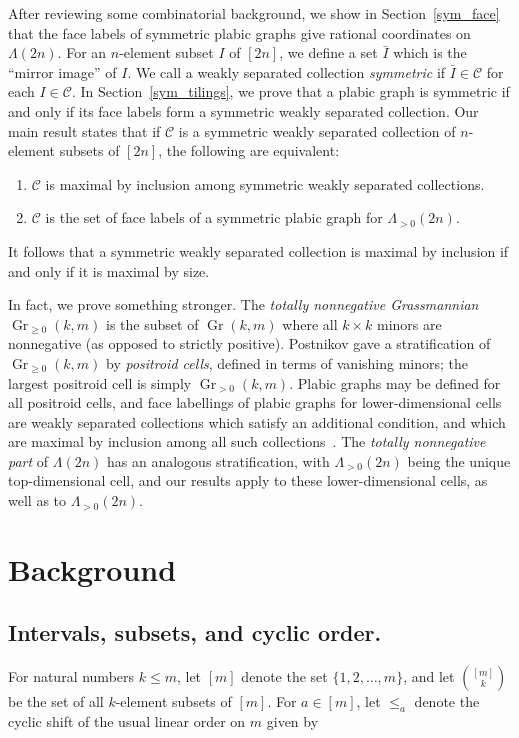 \documentclass[ALCO,ThmDefs,Unicode,epreuves]{cedram}
\DeclareMathOperator{\Gr}{Gr}
\newcommand{\Lm}{\Lambda}
\begin{document}
After reviewing some combinatorial background, we show in Section~\ref{sym_face} that the face labels of symmetric plabic graphs give rational coordinates on $\Lm(2n)$. For an $n$-element subset $I$ of $[2n]$, we define a set $\bar{I}$ which is the ``mirror image'' of $I$. We call a weakly separated collection \emph{symmetric} if $\bar{I} \in \mathcal{C}$ for each $I \in \mathcal{C}$. In Section~\ref{sym_tilings}, we prove that a plabic graph is symmetric if and only if its face labels form a symmetric weakly separated collection.
Our main result states that if $\mathcal{C}$ is a symmetric weakly separated collection of $n$-element subsets of $[2n]$, the following are equivalent:
\begin{enumerate}
\item $\mathcal{C}$ is maximal by inclusion among symmetric weakly separated collections.
\item $\mathcal{C}$ is the set of face labels of a symmetric plabic graph for $\Lm_{>0}(2n)$.
\end{enumerate}
It follows that a symmetric weakly separated collection is maximal by inclusion if and only if it is maximal by size.

In fact, we prove something stronger. The \emph{totally nonnegative Grassmannian} $\Gr_{\geq 0}(k,m)$ is the subset of $\Gr(k,m)$ where all $k \times k$ minors are nonnegative (as opposed to strictly positive). Postnikov gave a stratification of $\Gr_{\geq 0}(k,m)$ by \emph{positroid cells}, defined in terms of vanishing minors; the largest positroid cell is simply $\Gr_{>0}(k,m)$. Plabic graphs may be defined for all positroid cells, and face labellings of plabic graphs for lower-dimensional cells are weakly separated collections which satisfy an additional condition, and which are maximal by inclusion among all such collections~\cite{OPS15}. The \emph{totally nonnegative part} of $\Lm(2n)$ has an analogous stratification, with $\Lm_{>0}(2n)$ being the unique top-dimensional cell, and our results apply to these lower-dimensional cells, as well as to $\Lm_{>0}(2n)$.

\section{Background}
\label{back}
\subsection{Intervals, subsets, and cyclic order.}

For natural numbers $k \leq m$, let $[m]$ denote the set $\{1,2,\ldots,m\}$, and let $\binom{[m]}{k}$ be the set of all $k$-element subsets of $[m]$. For $a \in [m]$, let $\leq_a$ denote the cyclic shift of the usual linear order on $m$ given by 
 
\end{document}
